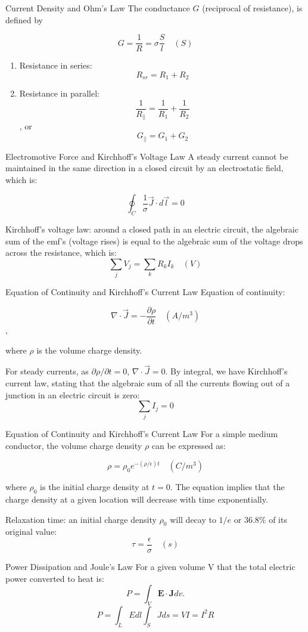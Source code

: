 \documentclass[xcolor={dvipsnames}]{beamer}
\begin{document}
\begin{frame}{Current Density and Ohm's Law}
The conductance $G$ (reciprocal of resistance), is defined by 

$$
G=\frac{1}{R} = \sigma \frac{S}{l}\quad (S)
$$

\begin{enumerate}
  \item Resistance in series: $$R_{sr} = R_1 + R_2$$
  \item Resistance in parallel: $$\frac{1}{R_{||}} = \frac{1}{R_1} + \frac{1}{R_2}$$, or $$G_{||} = G_1+G_2$$
\end{enumerate}
\end{frame}
\begin{frame}{Electromotive Force and Kirchhoff's Voltage Law}
A steady current cannot be maintained in the same direction in a closed circuit by an electrostatic field, which is:

$$
\oint_C \frac{1}{\sigma}\vec{J}\cdot d\vec{l} = 0
$$

Kirchhoff's voltage law: around a closed path in an electric circuit, the algebraic sum of the emf's (voltage rises) is equal to the algebraic sum of the voltage drops across the resistance, which is:
$$
\sum_j V_j = \sum_k R_k I_k\quad (V)
$$
\end{frame}
\begin{frame}{Equation of Continuity and Kirchhoff's Current Law}
Equation of continuity:

$$
\nabla\cdot\vec{J} = -\frac{\partial \rho}{\partial t} \quad (A/m^3)
$$,

where $\rho$ is the volume charge density. 

For steady currents, as $\partial \rho/\partial t= 0$, $\nabla\cdot \vec{J}=0$. By integral, we have Kirchhoff's current law, stating that the algebraic sum of all the currents flowing out of a junction in an electric circuit is zero: 
$$
\sum_j I_j = 0
$$

\end{frame}
\begin{frame}{Equation of Continuity and Kirchhoff's Current Law}
For a simple medium conductor, the volume charge density $\rho$ can be expressed as:

$$
\rho = \rho_0 e^{-(\rho/\epsilon)t}\quad (C/m^3)
$$

where $\rho_0$ is the initial charge density at $t=0$. The equation implies that the charge density at a given location will decrease with time exponentially. 


Relaxation time: an initial charge density $\rho_0$ will decay to $1/e$ or $36.8\%$ of its original value:
$$
\tau = \frac{\epsilon}{\sigma}\quad(s)
$$
\end{frame}

\begin{frame}{Power Dissipation and Joule’s Law}
For a given volume V that the total electric power converted to heat is:
$$P=\int_V \textbf{E}\cdot \textbf{J}dv.$$
$$P = \int_L Edl\int_S Jds = VI = I^2R$$

\end{frame}
\end{document}
